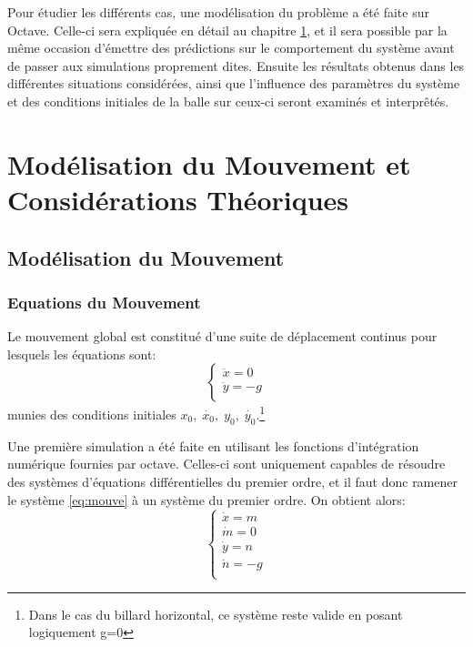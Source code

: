 \documentclass[a4paper]{report}
\begin{document}
Pour étudier les différents cas, une modélisation du problème a été faite sur Octave.  Celle-ci sera expliquée en détail au chapitre \ref{chap:modelisat}, et il sera possible par la même occasion d'émettre des prédictions sur le comportement du système avant de passer aux simulations proprement dites. Ensuite les résultats obtenus dans les différentes situations considérées, ainsi que l'influence des paramètres du système et des conditions initiales de la balle sur ceux-ci seront examinés et interprêtés.


\chapter{Modélisation du Mouvement et Considérations Théoriques}
\label{chap:modelisat}
\section{Modélisation du Mouvement}
\subsection{Equations du Mouvement}
Le mouvement global est constitué d'une suite de déplacement continus pour lesquels les équations sont:
\begin{equation}
\label{eq:mouve}
\begin{cases}
   \ddot{x}=0\\
   \ddot{y}=-g\\
\end{cases}
\end{equation}
munies des conditions initiales \(x_0, \; \dot{x_0}, \; y_0, \; \dot{y_0} \).\footnote{Dans le cas du billard horizontal, ce système reste valide en posant logiquement g=0}

Une première simulation a été faite en utilisant les fonctions d'intégration numérique fournies par octave. Celles-ci sont uniquement capables de résoudre des systèmes d'équations différentielles du premier ordre, et il faut donc ramener le système \ref{eq:mouve} à un système du premier ordre. On obtient alors:
\begin{equation}
\begin{cases}
   \dot{x}=m\\
   \dot{m}=0\\
   \dot{y}=n\\
   \dot{n}=-g\\
\end{cases}
\end{equation}
\end{document}
